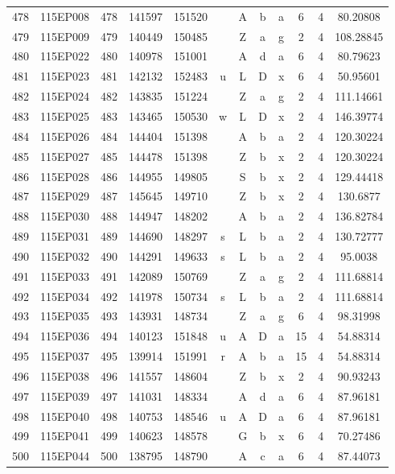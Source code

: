 \begin{tabular}{|*{12}{c|}}
478 & 115EP008 & 478 & 141597 & 151520 &  & A & b & a & 6 & 4 & 80.20808 \\ 
479 & 115EP009 & 479 & 140449 & 150485 &  & Z & a & g & 2 & 4 & 108.28845 \\ 
480 & 115EP022 & 480 & 140978 & 151001 &  & A & d & a & 6 & 4 & 80.79623 \\ 
481 & 115EP023 & 481 & 142132 & 152483 & u & L & D & x & 6 & 4 & 50.95601 \\ 
482 & 115EP024 & 482 & 143835 & 151224 &  & Z & a & g & 2 & 4 & 111.14661 \\ 
483 & 115EP025 & 483 & 143465 & 150530 & w & L & D & x & 2 & 4 & 146.39774 \\ 
484 & 115EP026 & 484 & 144404 & 151398 &  & A & b & a & 2 & 4 & 120.30224 \\ 
485 & 115EP027 & 485 & 144478 & 151398 &  & Z & b & x & 2 & 4 & 120.30224 \\ 
486 & 115EP028 & 486 & 144955 & 149805 &  & S & b & x & 2 & 4 & 129.44418 \\ 
487 & 115EP029 & 487 & 145645 & 149710 &  & Z & b & x & 2 & 4 & 130.6877 \\ 
488 & 115EP030 & 488 & 144947 & 148202 &  & A & b & a & 2 & 4 & 136.82784 \\ 
489 & 115EP031 & 489 & 144690 & 148297 & s & L & b & a & 2 & 4 & 130.72777 \\ 
490 & 115EP032 & 490 & 144291 & 149633 & s & L & b & a & 2 & 4 & 95.0038 \\ 
491 & 115EP033 & 491 & 142089 & 150769 &  & Z & a & g & 2 & 4 & 111.68814 \\ 
492 & 115EP034 & 492 & 141978 & 150734 & s & L & b & a & 2 & 4 & 111.68814 \\ 
493 & 115EP035 & 493 & 143931 & 148734 &  & Z & a & g & 6 & 4 & 98.31998 \\ 
494 & 115EP036 & 494 & 140123 & 151848 & u & A & D & a & 15 & 4 & 54.88314 \\ 
495 & 115EP037 & 495 & 139914 & 151991 & r & A & b & a & 15 & 4 & 54.88314 \\ 
496 & 115EP038 & 496 & 141557 & 148604 &  & Z & b & x & 2 & 4 & 90.93243 \\ 
497 & 115EP039 & 497 & 141031 & 148334 &  & A & d & a & 6 & 4 & 87.96181 \\ 
498 & 115EP040 & 498 & 140753 & 148546 & u & A & D & a & 6 & 4 & 87.96181 \\ 
499 & 115EP041 & 499 & 140623 & 148578 &  & G & b & x & 6 & 4 & 70.27486 \\ 
500 & 115EP044 & 500 & 138795 & 148790 &  & A & c & a & 6 & 4 & 87.44073 \\ 

\end{tabular}
